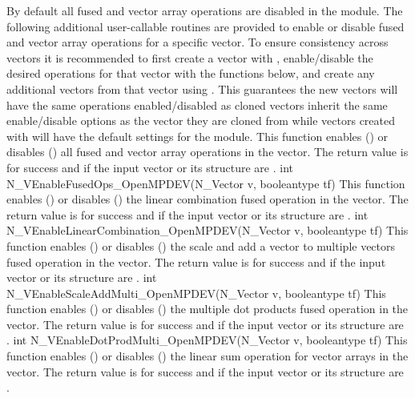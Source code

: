 By default all fused and vector array operations are disabled in the {\nvecopenmpdev}
module. The following additional user-callable routines are provided to
enable or disable fused and vector array operations for a specific vector. To
ensure consistency across vectors it is recommended to first create a vector
with , enable/disable the desired operations for that vector
with the functions below, and create any additional vectors from that vector
using . This guarantees the new vectors will have the same
operations enabled/disabled as cloned vectors inherit the same enable/disable
options as the vector they are cloned from while vectors created with
 will have the default settings for the {\nvecopenmpdev} module.
{
  This function enables () or disables () all fused and
  vector array operations in the {\nvecopenmpdev} vector. The return value is  for
  success and  if the input vector or its  structure are .
}
{
  int N\_VEnableFusedOps\_OpenMPDEV(N\_Vector v, booleantype tf)
}
{
  This function enables () or disables () the linear
  combination fused operation in the {\nvecopenmpdev} vector. The return value is  for
  success and  if the input vector or its  structure are .
}
{
  int N\_VEnableLinearCombination\_OpenMPDEV(N\_Vector v, booleantype tf)
}
{
  This function enables () or disables () the scale and
  add a vector to multiple vectors fused operation in the {\nvecopenmpdev} vector. The
  return value is  for success and  if the input vector or its
   structure are .
}
{
  int N\_VEnableScaleAddMulti\_OpenMPDEV(N\_Vector v, booleantype tf)
}
{
  This function enables () or disables () the multiple
  dot products fused operation in the {\nvecopenmpdev} vector. The return value is 
  for success and  if the input vector or its  structure are
  .
}
{
  int N\_VEnableDotProdMulti\_OpenMPDEV(N\_Vector v, booleantype tf)
}
{
  This function enables () or disables () the linear sum
  operation for vector arrays in the {\nvecopenmpdev} vector. The return value is  for
  success and  if the input vector or its  structure are .
}
